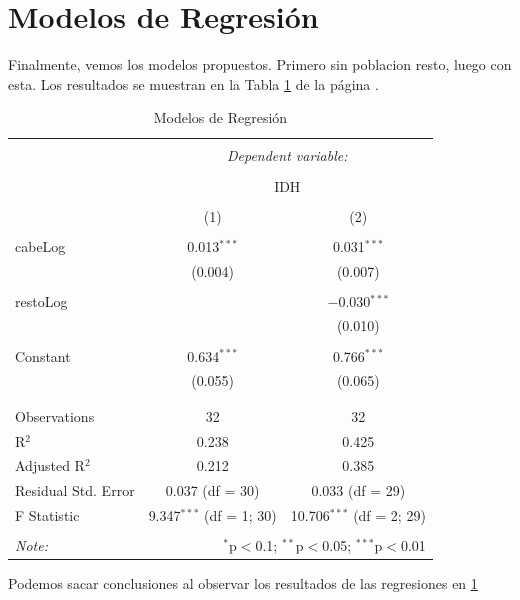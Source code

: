 \documentclass{article}
\begin{document}
\section{Modelos de Regresión}

Finalmente, vemos los modelos propuestos. Primero sin poblacion resto, luego con esta. Los resultados se muestran en la Tabla \ref{regresiones} de la página \pageref{regresiones}.



\begin{table}[!htbp] \centering 
  \caption{Modelos de Regresión} 
  \label{regresiones} 
\begin{tabular}{@{\extracolsep{5pt}}lcc} 
\\[-1.8ex]\hline 
\hline \\[-1.8ex] 
 & \multicolumn{2}{c}{\textit{Dependent variable:}} \\ 
\cline{2-3} 
\\[-1.8ex] & \multicolumn{2}{c}{IDH} \\ 
\\[-1.8ex] & (1) & (2)\\ 
\hline \\[-1.8ex] 
 cabeLog & 0.013$^{***}$ & 0.031$^{***}$ \\ 
  & (0.004) & (0.007) \\ 
  & & \\ 
 restoLog &  & $-$0.030$^{***}$ \\ 
  &  & (0.010) \\ 
  & & \\ 
 Constant & 0.634$^{***}$ & 0.766$^{***}$ \\ 
  & (0.055) & (0.065) \\ 
  & & \\ 
\hline \\[-1.8ex] 
Observations & 32 & 32 \\ 
R$^{2}$ & 0.238 & 0.425 \\ 
Adjusted R$^{2}$ & 0.212 & 0.385 \\ 
Residual Std. Error & 0.037 (df = 30) & 0.033 (df = 29) \\ 
F Statistic & 9.347$^{***}$ (df = 1; 30) & 10.706$^{***}$ (df = 2; 29) \\ 
\hline 
\hline \\[-1.8ex] 
\textit{Note:}  & \multicolumn{2}{r}{$^{*}$p$<$0.1; $^{**}$p$<$0.05; $^{***}$p$<$0.01} \\ 
\end{tabular} 
\end{table} 
Podemos sacar conclusiones al observar los resultados de las  regresiones en \ref{regresiones}
\end{document}
